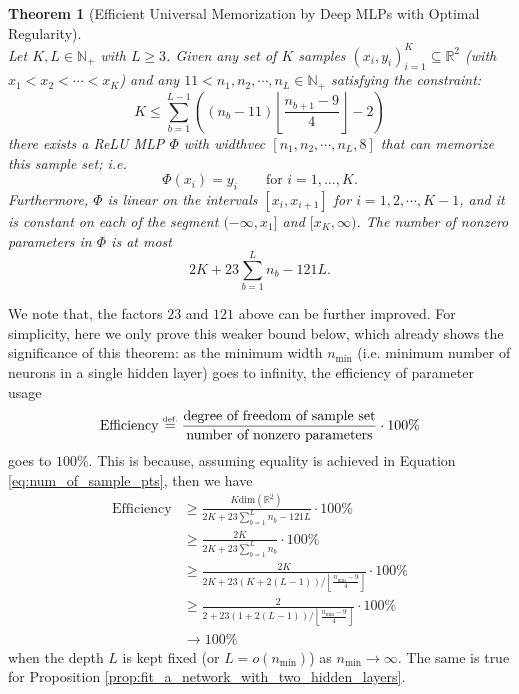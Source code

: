 \documentclass{article}
\numberwithin{equation}{section}
\newtheorem{theorem}{Theorem}[section]
\theoremstyle{definition}
\newcommand{\eqdef}{\ensuremath{\stackrel{\mbox{\upshape\tiny def.}}{=}}}
\begin{document}
\begin{theorem}[Efficient Universal Memorization by Deep MLPs with Optimal Regularity]
\label{prop:UnivMemorization_1D}
\hfill\\
Let $K,L\in \mathbb{N}_+$ with $L\ge 3$.  
Given any set of $K$ samples $(x_i,y_i)_{i=1}^{K}\subseteq\mathbb{R}^2$ (with $x_1<x_2<\cdots<x_K$) and any $11< n_1,n_2,\cdots,n_L\in\mathbb{N}_+$ satisfying the constraint:
    \begin{equation}
    \label{eq:num_of_sample_pts}
        K 
        \le 
        \sum_{b=1}^{L-1}
        \left(
            (n_b-11) 
            \left\lfloor \frac{n_{b+1}-9}{4} \right\rfloor
            -
            2
        \right)
    \end{equation}
    there exists a ReLU MLP $\Phi$ with widthvec $[n_1,n_2,\cdots,n_L,8]$ that can memorize this sample set; i.e.\
    \[
        \Phi(x_i)=y_i \qquad \mbox{for } i=1,\dots,K
    .
    \]
    Furthermore, $\Phi$ is linear on the intervals $[x_i,x_{i+1}]$ for $i=1,2,\cdots,K-1$, and it is constant on each of the segment $(-\infty,x_1]$ and $[x_K,\infty)$. The number of nonzero parameters in $\Phi$ is at most
    \[
        2K +  23 \sum_{b=1}^{L} n_b - 121L .
    \]
\end{theorem}

We note that, the factors $23$ and $121$ above can be further improved. For simplicity, here we only prove this weaker bound below, which already shows the significance of this theorem: as the minimum width $n_{\operatorname{min}}$ (i.e. minimum number of neurons in a single hidden layer) goes to infinity, the efficiency of parameter usage
\[
    \operatorname{Efficiency} 
    \eqdef
    \frac
    {\text{degree of freedom of sample set}}
    {\text{number of nonzero parameters}}
    \cdot
    100\%
\]
goes to $100\%$. This is because, assuming equality is achieved in Equation \ref{eq:num_of_sample_pts},
then we have
\begin{align*}
    \operatorname{Efficiency}  
    &\ge
    \frac
    {K\operatorname{dim(\mathbb{R}^2)}}
    {2K +  23 \sum_{b=1}^{L} n_b - 121L}
    \cdot 100\%
    \\
    &\ge
    \frac{2K}{2K + 23 \sum_{b=1}^{L} n_b}
    \cdot 100\%
    \\
    &\ge
    \frac{2K}
    {
        2K + 23 (K+2(L-1)) 
        / 
        \left\lfloor \frac{n_{\operatorname{min}}-9}{4} \right\rfloor
    }
    \cdot 100\%
    \\
    &\ge
    \frac{2}
    {
        2 + 23 (1+2(L-1)) 
        / 
        \left\lfloor \frac{n_{\operatorname{min}}-9}{4} \right\rfloor
    }
    \cdot 100\%
    \\
    &\rightarrow
    100\%
\end{align*}
when the depth $L$ is kept fixed (or $L=o(n_{\operatorname{min}})$) as $n_{\operatorname{min}} \rightarrow \infty$. The same is true for Proposition \ref{prop:fit_a_network_with_two_hidden_layers}.
\end{document}
